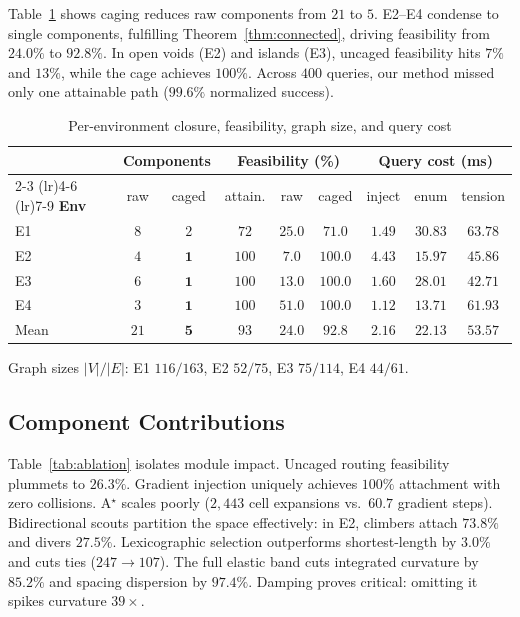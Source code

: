 \documentclass[conference]{IEEEtran}
\begin{document}
Table~\ref{tab:perenv} shows caging reduces raw components from $21$ to $5$. E2--E4 condense to single components, fulfilling Theorem~\ref{thm:connected}, driving feasibility from $24.0\%$ to $92.8\%$. In open voids (E2) and islands (E3), uncaged feasibility hits $7\%$ and $13\%$, while the cage achieves $100\%$. Across $400$ queries, our method missed only one attainable path ($99.6\%$ normalized success). 

\begin{table}[htbp]
\caption{Per-environment closure, feasibility, graph size, and query cost}
\label{tab:perenv}
\begin{center}
\setlength{\tabcolsep}{3.5pt}
\begin{tabular}{@{}lcccccccc@{}}
\toprule
& \multicolumn{2}{c}{\textbf{Components}} & \multicolumn{3}{c}{\textbf{Feasibility (\%)}} & \multicolumn{3}{c}{\textbf{Query cost (ms)}} \\
\cmidrule(lr){2-3} \cmidrule(lr){4-6} \cmidrule(lr){7-9}
\textbf{Env} & raw & caged & attain. & raw & caged & inject & enum & tension \\ \midrule
E1 & $8$ & $2$ & $72$ & $25.0$ & $71.0$ & $1.49$ & $30.83$ & $63.78$ \\
E2 & $4$ & $\mathbf{1}$ & $100$ & $7.0$ & $\mathbf{100.0}$ & $4.43$ & $15.97$ & $45.86$ \\
E3 & $6$ & $\mathbf{1}$ & $100$ & $13.0$ & $\mathbf{100.0}$ & $1.60$ & $28.01$ & $42.71$ \\
E4 & $3$ & $\mathbf{1}$ & $100$ & $51.0$ & $\mathbf{100.0}$ & $1.12$ & $13.71$ & $61.93$ \\ \midrule
Mean & $21$ & $\mathbf{5}$ & $93$ & $24.0$ & $\mathbf{92.8}$ & $2.16$ & $22.13$ & $53.57$ \\ \bottomrule
\end{tabular}
\end{center}
\footnotesize Graph sizes $|V|/|E|$: E1 $116/163$, E2 $52/75$, E3 $75/114$, E4 $44/61$.
\end{table}

\subsection{Component Contributions}

Table~\ref{tab:ablation} isolates module impact. Uncaged routing feasibility plummets to $26.3\%$. Gradient injection uniquely achieves $100\%$ attachment with zero collisions. A$^\star$ scales poorly ($2{,}443$ cell expansions vs.\ $60.7$ gradient steps). Bidirectional scouts partition the space effectively: in E2, climbers attach $73.8\%$ and divers $27.5\%$. Lexicographic selection outperforms shortest-length by $3.0\%$ and cuts ties ($247\rightarrow107$). The full elastic band cuts integrated curvature by $85.2\%$ and spacing dispersion by $97.4\%$. Damping proves critical: omitting it spikes curvature $39\times$.
\end{document}
